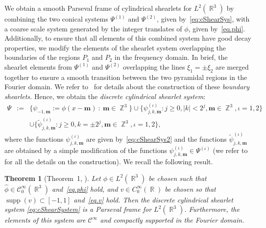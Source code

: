 \documentclass[11pt,a4paper]{article}
\numberwithin{equation}{section}
\newtheorem{theorem}{Theorem}[]
\DeclareMathOperator{\R}{\mathbb{R}}
\DeclareMathOperator{\Z}{\mathbb{Z}}
\newcommand{\abs}[1]{\left|#1\right|}
\DeclareMathOperator{\supp}{supp}
\newcommand{\m}{\vec{m}} %
\newcommand{\jkm}{{j, k, \m}} %
\newcommand{\gen}{\psi} %
\newcommand{\SHsys}{\Psi} %
\renewcommand{\vec}[1]{\boldsymbol{#1}} %
\begin{document}
We obtain a smooth Parseval frame of cylindrical shearlets for $L^2(\R^3)$ by combining the two conical systems $\SHsys^{(1)}$ and $\SHsys^{(2)}$, given by~\eqref{eq:cShearSys}, with a coarse scale
system generated by the integer translates of $\phi$, given by~\eqref{eq.phi}. Additionally, to ensure that all elements of this combined system have good decay properties, we modify the elements of the shearlet system overlapping the boundaries of the regions $P_1$ and $P_2$ in the frequency domain. In brief, the shearlet elements from $\SHsys^{(1)}$ and $\SHsys^{(2)}$ overlapping the lines $\xi_1 = \pm \xi_2$ are merged together to ensure a smooth transition between the two pyramidal regions in the Fourier domain. We refer to~\cite{GL_MMNP} for details about the construction of these {\it boundary shearlets.} 	Hence, we obtain  the \textit{discrete cylindrical shearlet system}:
\begin{eqnarray}  
    \SHsys &:=& \lbrace \gen_{-1,\vec{m}} := \phi(x - \vec{m}) \ : \ \vec{m} \in \Z^3 \rbrace
    \cup \lbrace \psi^{(\iota)}_{\jkm} : j \geq 0, \abs{k} < 2^j, \vec{m} \in \Z^3, \iota=1,2 \rbrace \nonumber \\
    && \cup \lbrace \tilde \psi^{(\iota)}_{\jkm} : j \geq 0, k = \pm 2^j, \vec{m} \in \Z^3, \iota=1,2 \rbrace,  \label{eq:cShearSystem}
    \end{eqnarray}  
where the functions $\psi^{(\iota)}_{\jkm}$ are given by~\eqref{eq:cShearSys2} and the functions $\tilde \psi^{(\iota)}_{\jkm}$ are obtained by a simple modification of the functions 
$\psi^{(\iota)}_{\jkm} \in \Psi^{(\iota)}$ (we refer to~\cite{Easley21} for all the details on the construction). We recall the following result.

\begin{theorem}[Theorem~1, \cite{Easley21}] \label{thm:cylShParsevalFrame}
Let $\phi \in L^2(\R^3)$ be chosen such that $\hat \phi \in \mathcal{C}_0^\infty(\R^3)$ and~\eqref{eq.phi} hold, and $v \in C_0^\infty(\R)$ be chosen so that $\supp (v) \subset [-1,1]$ and~\eqref{eq.v} hold.  
Then the discrete cylindrical shearlet system \eqref{eq:cShearSystem} is a Parseval frame
for $L^2(\R^3)$. Furthermore, the elements of this system are $\mathcal{C}^\infty$ and compactly supported in the Fourier domain.
\end{theorem}
\end{document}

